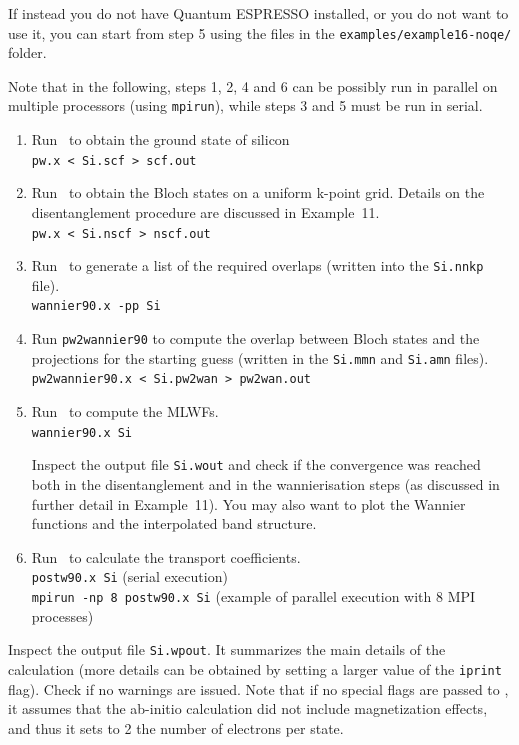 \documentclass[a4paper,11pt,twoside]{article}
\begin{document}
If instead you do not have Quantum ESPRESSO installed, or you do not want to
use it, you can start from step 5 using the files in the
{\tt examples/example16-noqe/} folder.

Note that in the following, steps 1, 2, 4 and 6 can be possibly run in parallel
on multiple processors (using {\tt mpirun}), while steps 3 and 5 must
be run in serial.

\begin{enumerate}
\item Run \pwscf\ to obtain the ground state of silicon\\
{\tt pw.x < Si.scf > scf.out}

\item Run \pwscf\ to obtain the Bloch states on a uniform k-point
  grid. Details on the disentanglement procedure are discussed in Example~11.\\ 
{\tt pw.x < Si.nscf > nscf.out}

\item Run \wannier\ to generate a list of the required overlaps (written
  into the {\tt Si.nnkp} file).\\
{\tt wannier90.x -pp Si}

\item Run {\tt pw2wannier90} to compute the overlap between Bloch
  states and the projections for the starting guess (written in the
  {\tt Si.mmn} and {\tt  Si.amn} files).\\
{\tt pw2wannier90.x < Si.pw2wan > pw2wan.out}

\item Run \wannier\ to compute the MLWFs.\\
{\tt wannier90.x Si}

Inspect the output file {\tt Si.wout} and check if the convergence was reached both in the
disentanglement and in the wannierisation steps (as discussed in further detail in Example~11).
You may also want to plot the Wannier functions and the interpolated band structure.

\item Run \postw\ to calculate the transport coefficients.\\
{\tt postw90.x Si} (serial execution) \\
{\tt mpirun -np 8 postw90.x Si} (example of parallel execution with 8
MPI processes) 
\end{enumerate}

Inspect the output file {\tt Si.wpout}. It summarizes the main details of the calculation (more details can be obtained by setting a larger value of the \verb#iprint# flag). 
Check if no warnings are issued. Note that if no special flags are passed to \bw, it assumes that
the ab-initio calculation did not include magnetization effects, and thus it sets to 2 the
number of electrons per state.
\end{document}
